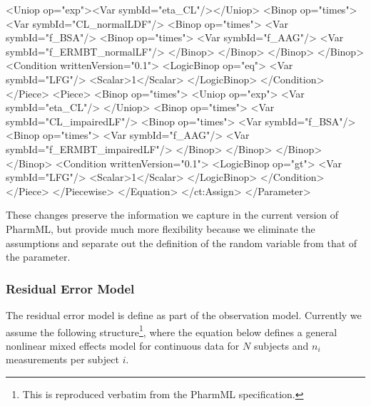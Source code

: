 \documentclass[a4paper,11pt]{article}
\newcommand{\pharmml}{PharmML\xspace}
\begin{document}
\begin{xmlcode}
                        <Uniop op="exp"><Var symbId="eta_CL"/></Uniop>
                        <Binop op="times">
                            <Var symbId="CL_normalLDF"/>
                            <Binop op="times">
                                <Var symbId="f_BSA"/>
                                <Binop op="times">
                                    <Var symbId="f_AAG"/>
                                    <Var symbId="f_ERMBT_normalLF"/>
                                </Binop>
                            </Binop>
                        </Binop>
                    </Binop>
                    <Condition writtenVersion="0.1">
                        <LogicBinop op="eq">
                            <Var symbId="LFG"/>
                            <Scalar>1</Scalar>
                        </LogicBinop>
                    </Condition>
                </Piece>
                <Piece>
                    <Binop op="times">
                        <Uniop op="exp">
                            <Var symbId="eta_CL"/>
                        </Uniop>
                        <Binop op="times">
                            <Var symbId="CL_impairedLF"/>
                            <Binop op="times">
                                <Var symbId="f_BSA"/>
                                <Binop op="times">
                                    <Var symbId="f_AAG"/>
                                    <Var symbId="f_ERMBT_impairedLF"/>
                                </Binop>
                            </Binop>
                        </Binop>
                    </Binop>
                    <Condition writtenVersion="0.1">
                        <LogicBinop op="gt">
                            <Var symbId="LFG"/>
                            <Scalar>1</Scalar>
                        </LogicBinop>
                    </Condition>
                </Piece>
            </Piecewise>
        </Equation>
    </ct:Assign>
</Parameter>
\end{xmlcode}


These changes preserve the information we capture in the
current version of \pharmml, but provide much more flexibility because
we eliminate the assumptions and separate out the definition of the
random variable from that of the parameter.


\subsubsection{Residual Error Model}

The residual error model is define as part of the observation
model. Currently we assume the following structure\footnote{This is
  reproduced verbatim from the \pharmml specification.}, where the
equation below defines a general nonlinear mixed effects model for
continuous data for $N$ subjects and $n_i$ measurements per subject
$i$.
\end{document}
